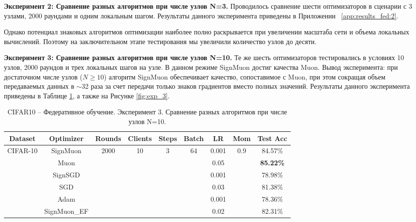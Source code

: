 \documentclass{article}
\begin{document}
\textbf{Эксперимент 2: Сравнение разных алгоритмов при числе узлов N=3.} Проводилось сравнение шести оптимизаторов в сценарии с 3 узлами, 2000 раундами и одним локальным шагом. Результаты данного эксперимента приведены в Приложении ~\ref{app:results_fed:2}.

Однако потенциал знаковых алгоритмов оптимизации наиболее полно раскрывается при увеличении масштаба сети и объема локальных вычислений. Поэтому на заключительном этапе тестирования мы увеличили количество узлов до десяти.

\textbf{Эксперимент 3: Сравнение разных алгоритмов при числе узлов N=10.} Те же шесть оптимизаторов тестировались в условиях 10 узлов, 2000 раундов и трех локальных шагов на узле. В данном режиме SignMuon достиг качества Muon. Вывод эксперимента: при достаточном числе узлов ($N \geq 10$) алгоритм SignMuon обеспечивает качество, сопоставимое с Muon, при этом сокращая объем передаваемых данных в $\sim$32 раза за счет передачи только знаков градиентов вместо полных значений. Результаты данного эксперимента приведены в Таблице \ref{tab:exp_3}, а также на Рисунке \ref{fig:exp_3}.

\begin{table}[H]
\centering
\caption{CIFAR10 -- Федеративное обучение. Эксперимент 3. Сравнение разных алгоритмов при числе узлов N=10.}
\label{tab:exp_3}
\small
\renewcommand{\arraystretch}{1.2}
\begin{tabular}{|c|c|c|c|c|c|c|c|c|}
\hline
\textbf{Dataset} & \textbf{Optimizer} & \textbf{Rounds} & \textbf{Clients} & \textbf{Steps} & \textbf{Batch} & \textbf{LR} & \textbf{Mom} & \textbf{Test Acc} \\
\hline
\multirow{6}{*}{CIFAR-10} & SignMuon & \multirow{6}{*}{2000} & \multirow{6}{*}{10} & \multirow{6}{*}{3} & \multirow{6}{*}{64} & 0.001 & \multirow{6}{*}{0.9} & 84.57\% \\
\cline{2-2} \cline{7-7} \cline{9-9}
 & Muon & & & & & 0.05 & & \textbf{85.22\%} \\
\cline{2-2} \cline{7-7} \cline{9-9}
 & SignSGD & & & & & 0.001 & & 78.98\% \\
\cline{2-2} \cline{7-7} \cline{9-9}
 & SGD & & & & & 0.03 & & 81.38\% \\
\cline{2-2} \cline{7-7} \cline{9-9}
 & Adam & & & & & 0.001 & & 78.36\% \\
\cline{2-2} \cline{7-7} \cline{9-9}
 & SignMuon\_EF & & & & & 0.02 & & 82.31\% \\
\hline
\end{tabular}
\end{table}
\end{document}
